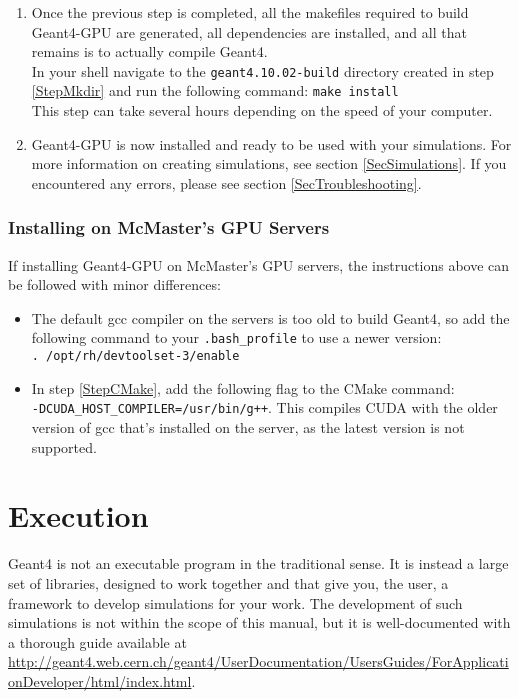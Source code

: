 \documentclass[12pt]{article}
\begin{document}
\begin{enumerate}
\item Once the previous step is completed, all the makefiles required to build Geant4-GPU are generated, all dependencies are installed, and all that remains is to actually compile Geant4.\\

In your shell navigate to the \texttt{geant4.10.02-build} directory created in step \ref{StepMkdir} and run the following command:
\texttt{make install}\\

This step can take several hours depending on the speed of your computer.
\item Geant4-GPU is now installed and ready to be used with your simulations. For more information on creating simulations, see section \ref{SecSimulations}. If you encountered any errors, please see section \ref{SecTroubleshooting}.
\end{enumerate}

\subsubsection{Installing on McMaster's GPU Servers}\label{SecMac}
If installing Geant4-GPU on McMaster's GPU servers, the instructions above can be followed with minor differences:
\begin{itemize}
\item The default gcc compiler on the servers is too old to build Geant4, so add the following command to your \texttt{.bash\_profile} to use a newer version:\\
\texttt{. /opt/rh/devtoolset-3/enable}
\item In step \ref{StepCMake}, add the following flag to the CMake command:\\
\texttt{-DCUDA\_HOST\_COMPILER=/usr/bin/g++}. This compiles CUDA with the older version of gcc that's installed on the server, as the latest version is not supported.
\end{itemize}

\section{Execution} %
Geant4 is not an executable program in the traditional sense. It is instead a large set of libraries, designed to work together and that give you, the user, a framework to develop simulations for your work. The development of such simulations is not within the scope of this manual, but it is well-documented with a thorough guide available at \url{http://geant4.web.cern.ch/geant4/UserDocumentation/UsersGuides/ForApplicationDeveloper/html/index.html}.\\
\end{document}
